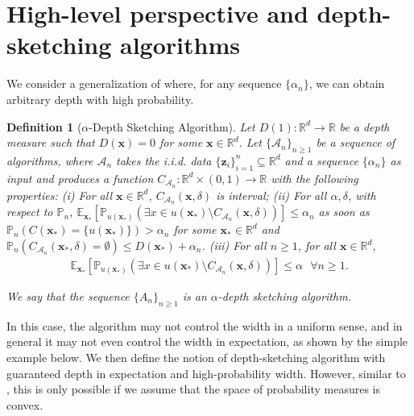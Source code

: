 \documentclass{article} %
\newtheorem{definition}{Definition}[section]
\theoremstyle{remark}
\theoremstyle{definition}      %
\begin{document}
\section{High-level perspective and depth-sketching algorithms}

We consider a generalization of  where, for any sequence $\{\alpha_n\}$, we can obtain arbitrary depth with high probability.

\begin{definition}[$\alpha$-Depth Sketching Algorithm] \label{def:depth_sketch_alg}
  Let $D(1) : \mathbb{R}^d \rightarrow \mathbb{R}$ be a depth measure such that $D(\bm{x}) = 0$ for some  $\bm{x} \in \mathbb{R}^d$. Let $\{\mathcal{A}_n\}_{n \geq 1}$ be a sequence of algorithms, where $\mathcal{A}_n$ 
  takes the i.i.d. data $\{ \bm z_i \}_{i=1}^{n} \subseteq \mathbb{R}^d$ and a sequence $\{\alpha_n\}$ as input and produces a function $C_{\mathcal{A}_n}: \mathbb{R}^d \times (0,1) \rightarrow \mathbb{R}$ with the following properties: (i) For all $\bm{x} \in \mathbb{R}^d$, $C_{\mathcal{A}_n}(\bm{x},\delta)$ is interval; (ii) For all $\alpha,\delta$, with respect to $\mathbb{P}_n$, $\mathbb{E}_{\bm{x}_*}[\mathbb{P}_{u(\bm{x_*})}(\exists x \in u(\bm{x_*}) \setminus C_{\mathcal{A}_n}(\bm{x},\delta))]  \leq \alpha_n$ as soon as  $\mathbb{P}_n(C(\bm{x_*}) = \{u(\bm{x_*})\}) > \alpha_n$ for some $\bm{x_*} \in \mathbb{R}^d$ and $\mathbb{P}_n(C_{\mathcal{A}_n}(\bm{x_*},\delta) = \emptyset) \leq D(\bm{x_*}) + \alpha_n$. (iii) For all $n \geq 1$, for all $\bm{x} \in \mathbb{R}^d$,
      \begin{align*}
          \mathbb{E}_{\bm{x}_*}[\mathbb{P}_{u(\bm{x_*})}(\exists x \in u(\bm{x_*}) \setminus C_{\mathcal{A}_n}(\bm{x},\delta))]  \leq \alpha  ~~~ \forall n \geq 1.
      \end{align*}

  We say that the sequence $\{A_n\}_{n \geq 1}$ is an \emph{$\alpha$-depth sketching algorithm}.
\end{definition}

In this case, the algorithm may not control the width in a uniform sense, and in general it may not even control the width in expectation, as shown by the simple example below. We then define the notion of depth-sketching algorithm with guaranteed depth in expectation and high-probability width. However, similar to \cite{angelopoulos2024conformal}, this is only possible if we assume that the space of probability measures is convex.
\end{document}
